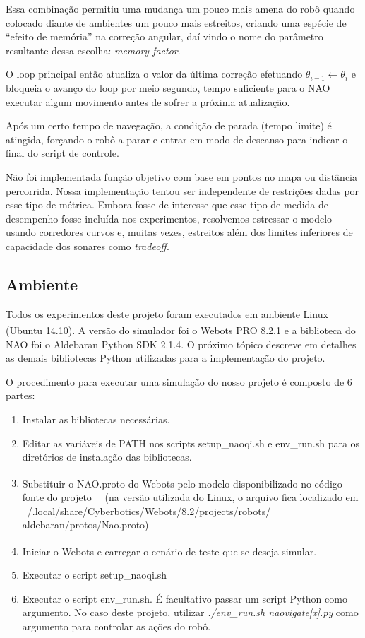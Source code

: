 \documentclass[twoside,conference,a4paper]{IEEEtran}
\begin{document}
Essa combinação permitiu uma mudança um pouco mais amena do robô quando colocado diante de ambientes um pouco mais estreitos, criando uma espécie de ``efeito de memória'' na correção angular, daí vindo o nome do parâmetro resultante dessa escolha: \textit{memory factor}.

O loop principal então atualiza o valor da última correção efetuando $\theta_{i-1} \leftarrow \theta_i$ e bloqueia o avanço do loop por meio segundo, tempo suficiente para o NAO executar algum movimento antes de sofrer a próxima atualização.

Após um certo tempo de navegação, a condição de parada (tempo limite) é atingida, forçando o robô a parar e entrar em modo de descanso para indicar o final do script de controle.

Não foi implementada função objetivo com base em pontos no mapa ou distância percorrida. Nossa implementação tentou ser independente de restrições dadas por esse tipo de métrica. Embora fosse de interesse que esse tipo de medida de desempenho fosse incluída nos experimentos, resolvemos estressar o modelo usando corredores curvos e, muitas vezes, estreitos além dos limites inferiores de capacidade dos sonares como \textit{tradeoff}.

\subsection{Ambiente}
\label{sec:ambiente}
Todos os experimentos deste projeto foram executados em ambiente Linux (Ubuntu 14.10). 
A versão do simulador foi o Webots\textsuperscript{\textregistered} PRO 8.2.1 e a biblioteca do NAO foi o Aldebaran Python SDK 2.1.4. O próximo tópico descreve em detalhes as demais bibliotecas Python utilizadas para a implementação do projeto.

O procedimento para executar uma simulação do nosso projeto é composto de 6 partes:

\begin{enumerate}
\item Instalar as bibliotecas necessárias.
\item Editar as variáveis de PATH nos scripts setup\_naoqi.sh e env\_run.sh para os diretórios de instalação das bibliotecas.
\item Substituir o NAO.proto do Webots\textsuperscript{\textregistered} pelo modelo disponibilizado no código fonte do projeto~\cite{AnnaPawlicka2013}~\cite{CyberboticsNao}  (na versão utilizada do Linux, o arquivo fica localizado em ~/.local/share/Cyberbotics/Webots/8.2/projects/robots/\\
aldebaran/protos/Nao.proto)
\item Iniciar o Webots\textsuperscript{\textregistered} e carregar o cenário de teste que se deseja simular.
\item Executar o script setup\_naoqi.sh
\item Executar o script env\_run.sh. É facultativo passar um script Python como argumento. No caso deste projeto, utilizar \textit{./env\_run.sh naovigate[x].py} como argumento para controlar as ações do robô.
\end{enumerate}
\end{document}

